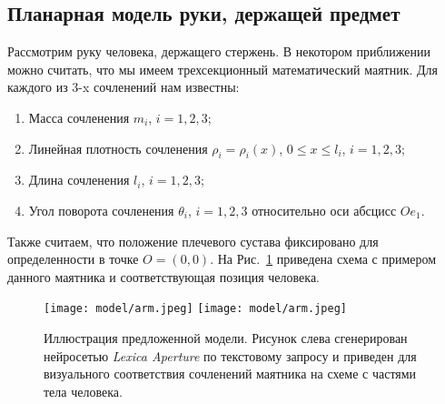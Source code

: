\documentclass[../../doc.tex]{subfiles}
\begin{document}
    \subsection{Планарная модель руки, держащей предмет}
    
    Рассмотрим руку человека, держащего стержень.
    В некотором приближении можно считать, что мы имеем трехсекционный математический маятник.
    Для каждого из $3$-x сочленений нам известны:
    \begin{enumerate}\itemsep0em 
        \item Масса сочленения $m_i$, $i=1,2,3$;
        \item Линейная плотность сочленения $\rho_i = \rho_i(x)$, $0 \leqslant x \leqslant l_i$, $i=1,2,3$;
        \item Длина сочленения $l_i$, $i=1,2,3$;
        \item Угол поворота сочленения $\theta_i$, $i=1,2,3$ относительно оси абсцисс $Oe_1$.
    \end{enumerate}

    Также считаем, что положение плечевого сустава фиксировано для определенности в точке $O = (0,0)$.
    На Рис.~\ref{img:arm-model} приведена схема с примером данного маятника и соответствующая позиция человека.

    \vfill
    \begin{figure}[h]
        \begin{center}
            \texttt{[image: model/arm.jpeg]}
            \texttt{[image: model/arm.jpeg]}
        \end{center}
        \caption{
            Иллюстрация предложенной модели.
            Рисунок слева сгенерирован нейросетью \textit{Lexica Aperture} по текстовому запросу и приведен для визуального соответствия сочленений маятника на схеме с частями тела человека.
        }
        \label{img:arm-model}
    \end{figure}
    


    \ifSubfilesClassLoaded{
        \nocite{*}
        \clearpage
        
        
    }{}
\end{document}
